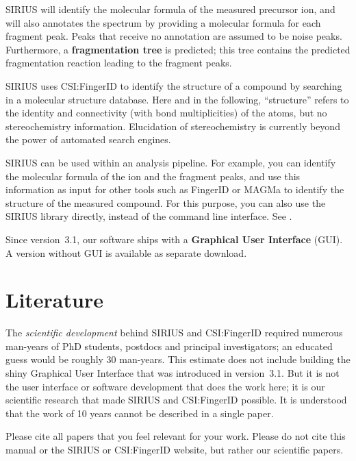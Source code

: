 \documentclass[letterpaper,10pt,openany,oneside]{sphinxmanual}
\begin{document}
SIRIUS will identify the molecular formula of the measured precursor ion,
and will also annotates the spectrum by providing a molecular formula for
each fragment peak.  Peaks that receive no annotation are assumed to be noise
peaks.  Furthermore, a \textbf{fragmentation tree} is predicted; this tree
contains the predicted fragmentation reaction leading to the fragment peaks.

SIRIUS uses CSI:FingerID to identify the structure of a compound by searching
in a molecular structure database.  Here and in the following, ``structure''
refers to the identity and connectivity (with bond multiplicities) of the
atoms, but no stereochemistry information.  Elucidation of stereochemistry is
currently beyond the power of automated search engines.

SIRIUS can be used within an analysis pipeline. For example, you can
identify the molecular formula of the ion and the fragment peaks, and use
this information as input for other tools such as FingerID or MAGMa to
identify the structure of the measured compound. For this purpose, you can
also use the SIRIUS library directly, instead of the command line
interface. See {\hyperref[library::doc]{}}.

Since version~3.1, our software ships with a \textbf{Graphical User
Interface} (GUI).  A version without GUI is available as separate download.

\clearpage


\section{Literature}
\label{introduction:literature}

The \emph{scientific development} behind SIRIUS and CSI:FingerID required
numerous man-years of PhD students, postdocs and principal investigators; an
educated guess would be roughly 30 man-years.  This estimate does not include
building the shiny Graphical User Interface that was introduced in
version~3.1.  But it is not the user interface or software development that
does the work here; it is our scientific research that made SIRIUS and
CSI:FingerID possible.  It is understood that the work of 10 years cannot be
described in a single paper.

Please cite all papers that you feel relevant for your work.  Please do not
cite this manual or the SIRIUS or CSI:FingerID website, but rather our
scientific papers.
\end{document}
